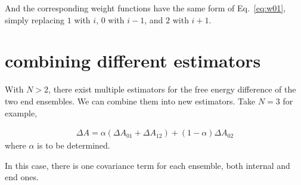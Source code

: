 \documentclass[notitlepage, amsmath, amssymb, aps]{revtex4-1}
\begin{document}
And the corresponding weight functions have the same form of Eq.~\ref{eq:w01},
simply replacing $1$ with $i$, $0$ with $i-1$, and $2$ with $i+1$.


\section{combining different estimators} \label{sec:combine}

With $N>2$, there exist multiple estimators for the free energy difference of the two end ensembles.
We can combine them into new estimators.
Take $N=3$ for example,

\begin{align}
    \Delta A = \alpha (\Delta A_{01} + \Delta A_{12}) + (1-\alpha)\Delta A_{02}
\end{align}
where $\alpha$ is to be determined.

In this case, there is one covariance term for each ensemble, both internal and end ones.
\end{document}
